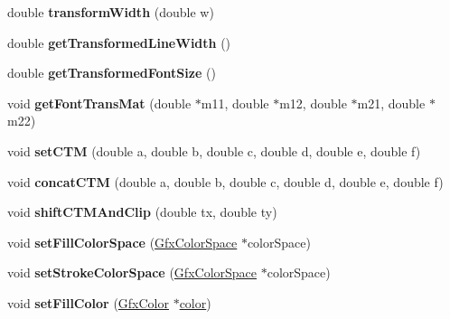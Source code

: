 \begin{DoxyCompactItemize}
double {\bfseries transform\+Width} (double w)
\item 
\mbox{\label{class_gfx_state_ad25ace9c1b42a7019bf2a78e51a68b2a}} 
double {\bfseries get\+Transformed\+Line\+Width} ()
\item 
\mbox{\label{class_gfx_state_ad56d96275d791578ed232f9ad7d3c557}} 
double {\bfseries get\+Transformed\+Font\+Size} ()
\item 
\mbox{\label{class_gfx_state_a6c2f4aaaf1e9045ba398347cd26190ad}} 
void {\bfseries get\+Font\+Trans\+Mat} (double $\ast$m11, double $\ast$m12, double $\ast$m21, double $\ast$m22)
\item 
\mbox{\label{class_gfx_state_a65bbcca0760aa85d89cda635094379fa}} 
void {\bfseries set\+C\+TM} (double a, double b, double c, double d, double e, double f)
\item 
\mbox{\label{class_gfx_state_a54f040e56fd26a2d2c8126d17cff2e1d}} 
void {\bfseries concat\+C\+TM} (double a, double b, double c, double d, double e, double f)
\item 
\mbox{\label{class_gfx_state_ac2fc1b95e74a021cf3e5066e7dc1822c}} 
void {\bfseries shift\+C\+T\+M\+And\+Clip} (double tx, double ty)
\item 
\mbox{\label{class_gfx_state_a1d32fe0e28ec33d960d5921abd7d3e98}} 
void {\bfseries set\+Fill\+Color\+Space} (\hyperlink{class_gfx_color_space}{Gfx\+Color\+Space} $\ast$color\+Space)
\item 
\mbox{\label{class_gfx_state_a6f7c3095cd105a46e55dc8a0d58e7d1f}} 
void {\bfseries set\+Stroke\+Color\+Space} (\hyperlink{class_gfx_color_space}{Gfx\+Color\+Space} $\ast$color\+Space)
\item 
\mbox{\label{class_gfx_state_a00ec64bb0e21fe8e3957ba4a8d00fd8b}} 
void {\bfseries set\+Fill\+Color} (\hyperlink{struct_gfx_color}{Gfx\+Color} $\ast$\hyperlink{structcolor}{color})
\item 
\mbox{\label{class_gfx_state_ac7a1a14c58ed79c8d2fcfd043869e071}} 

\end{DoxyCompactItemize}
